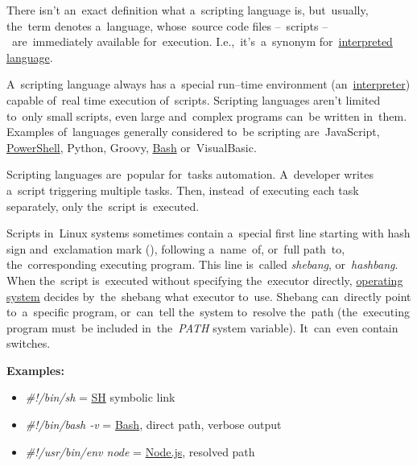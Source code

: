 \label{scriptinglanguages}
There isn't an~exact definition what a~scripting language is, but~usually, the~term denotes a~language, whose~source code files --~scripts --~are~immediately available for~execution.
I.e.,~it's~a~synonym for~\hyperref[compiledinterpretedlanguages]{interpreted language}.

A~scripting language always has a~special run--time environment (an~\hyperref[compiledinterpretedlanguages]{interpreter}) capable of~real time execution of~scripts.
Scripting languages aren't limited to~only small scripts, even large and~complex programs can~be written in~them.
Examples of~languages generally considered to~be scripting are~JavaScript, \hyperref[powershell]{PowerShell}, Python, Groovy, \hyperref[shbash]{Bash} or~VisualBasic.

Scripting languages are~popular for~tasks automation.
A~developer writes a~script triggering multiple tasks.
Then, instead~of executing each task separately, only the~script is~executed.

\label{shebang}
Scripts in~Linux systems sometimes contain a~special first line starting with hash sign and~exclamation mark (\itq{\#!}), following a~name~of, or~full path~to, the~corresponding executing program.
This line is~called \textit{shebang}, or~\textit{hashbang}.
When the~script is~executed without specifying the~executor directly, \hyperref[os]{operating system} decides by~the~shebang what executor to~use.
Shebang can~directly point to~a~specific program, or~can~tell the~system to~resolve the~path (the~executing program must~be included in~the~\textit{PATH} system variable).
It~can~even contain switches.
\newline

\noindent \textbf{Examples:}
\begin{itemize}
    \item \textit{\#!/bin/sh} = \hyperref[shbash]{SH} symbolic link
    \item \textit{\#!/bin/bash -v} = \hyperref[shbash]{Bash}, direct path, verbose output
    \item \textit{\#!/usr/bin/env node} = \hyperref[nodejs]{Node.js}, resolved path
\end{itemize}
